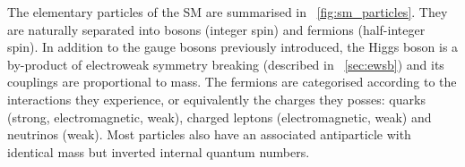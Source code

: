 The elementary particles of the SM are summarised in \Figure~\ref{fig:sm_particles}.
They are naturally separated into bosons (integer spin) and fermions (half-integer spin).
In addition to the gauge bosons previously introduced, the Higgs boson is a by-product
of electroweak symmetry breaking (described in \Section~\ref{sec:ewsb}) and its
couplings are proportional to mass. The fermions are categorised according to the
interactions they experience, or equivalently the charges they posses: quarks
(strong, electromagnetic, weak), charged leptons (electromagnetic, weak) and neutrinos 
(weak). Most particles also have an associated antiparticle with identical mass
but inverted internal quantum numbers.
